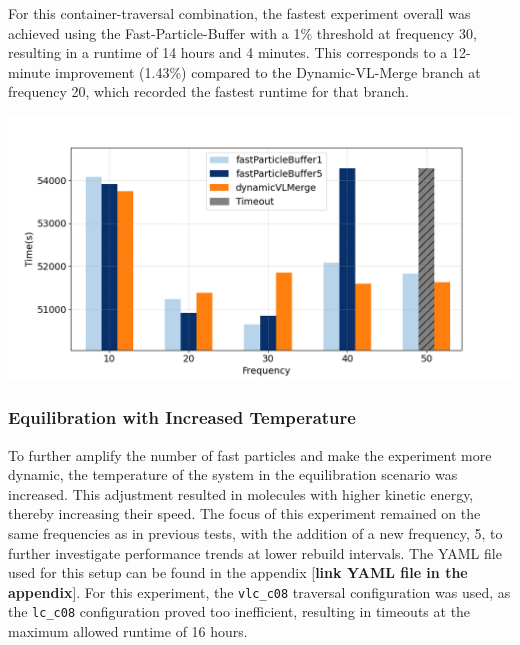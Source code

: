 For this container-traversal combination, the fastest experiment overall was achieved using the Fast-Particle-Buffer with a 1\% threshold at frequency 30, resulting in a runtime of 14 hours and 4 minutes. This corresponds to a 12-minute improvement (1.43\%) compared to the Dynamic-VL-Merge branch at frequency 20, which recorded the fastest runtime for that branch.


\begin{center}
    \includegraphics[width=0.8\linewidth]{graphs/spinodalDecomposition/lcc08.png}
    \captionsetup{hypcap=false}
    \label{fig:equ_normla_lcc08}
\end{center}
    
    



\subsubsection{Equilibration with Increased Temperature}

To further amplify the number of fast particles and make the experiment more dynamic, the temperature of the system in the equilibration scenario was increased. This adjustment resulted in molecules with higher kinetic energy, thereby increasing their speed. The focus of this experiment remained on the same frequencies as in previous tests, with the addition of a new frequency, 5, to further investigate performance trends at lower rebuild intervals. The YAML file used for this setup can be found in the appendix [\textbf{link YAML file in the appendix}]. For this experiment, the \texttt{vlc\_c08} traversal configuration was used, as the \texttt{lc\_c08} configuration proved too inefficient, resulting in timeouts at the maximum allowed runtime of 16 hours.

